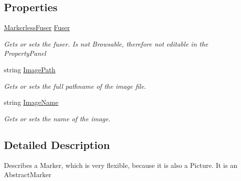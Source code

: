 \subsection*{Properties}
\begin{DoxyCompactItemize}
\item 
\hyperlink{class_a_rdev_kit_1_1_model_1_1_project_1_1_markerless_fuser}{Markerless\-Fuser} \hyperlink{class_a_rdev_kit_1_1_model_1_1_project_1_1_image_trackable_a34677234d0cd36ad12af730d87f1a211}{Fuser}
\begin{DoxyCompactList}\small\item\em Gets or sets the fuser. Is not Browsable, therefore not editable in the Property\-Panel \end{DoxyCompactList}\item 
string \hyperlink{class_a_rdev_kit_1_1_model_1_1_project_1_1_image_trackable_abf66216adfd7fcd5f94a6bdf55f30a36}{Image\-Path}
\begin{DoxyCompactList}\small\item\em Gets or sets the full pathname of the image file. \end{DoxyCompactList}\item 
string \hyperlink{class_a_rdev_kit_1_1_model_1_1_project_1_1_image_trackable_ade2bba8d745b4c9f758bb22f7e82a946}{Image\-Name}
\begin{DoxyCompactList}\small\item\em Gets or sets the name of the image. \end{DoxyCompactList}\end{DoxyCompactItemize}


\subsection{Detailed Description}
Describes a Marker, which is very flexible, because it is also a Picture. It is an Abstract\-Marker 



